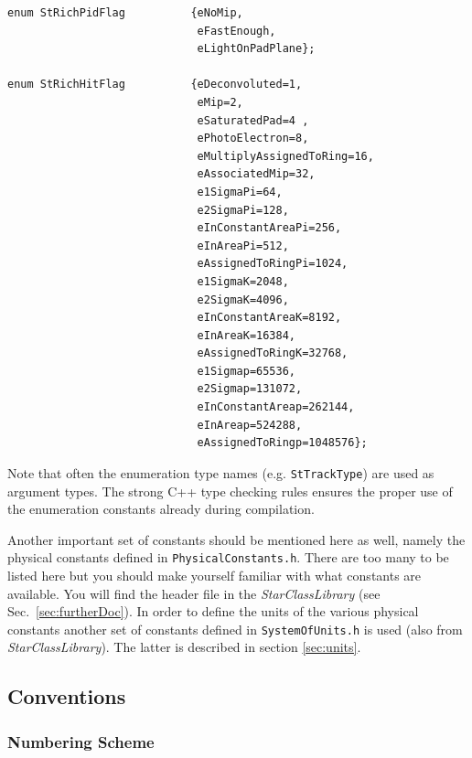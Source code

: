 \documentclass[twoside]{article}
\newcommand{\name}[1]{\textsl{#1}}%
\begin{document}
\begin{verbatim}
enum StRichPidFlag          {eNoMip,
                             eFastEnough,
                             eLightOnPadPlane};

enum StRichHitFlag          {eDeconvoluted=1,
                             eMip=2,
                             eSaturatedPad=4 ,
                             ePhotoElectron=8,
                             eMultiplyAssignedToRing=16,
                             eAssociatedMip=32,
                             e1SigmaPi=64,
                             e2SigmaPi=128,
                             eInConstantAreaPi=256,
                             eInAreaPi=512,
                             eAssignedToRingPi=1024,
                             e1SigmaK=2048,
                             e2SigmaK=4096,
                             eInConstantAreaK=8192,
                             eInAreaK=16384,
                             eAssignedToRingK=32768,
                             e1Sigmap=65536,
                             e2Sigmap=131072,
                             eInConstantAreap=262144,
                             eInAreap=524288,
                             eAssignedToRingp=1048576};
\end{verbatim}

Note that often the enumeration type names (e.g. \texttt{StTrackType})
are used as argument types. The strong C++ type checking rules ensures
the proper use of the enumeration constants already during
compilation.

Another important set of constants should be mentioned here as well,
namely the physical constants defined in \texttt{PhysicalConstants.h}.
There are too many to be listed here but you should make yourself
familiar with what constants are available. You will find the header
file in the \name{StarClassLibrary} (see Sec.~\ref{sec:furtherDoc}).
 In order to define the units of the various
physical constants another set of constants defined in
\texttt{SystemOfUnits.h} is used (also from \name{StarClassLibrary}).
The latter is described in section \ref{sec:units}.

\subsection{Conventions}
\label{sec:conventions}

\subsubsection{Numbering Scheme}
\label{sec:conventionsNumbering}
\end{document}
